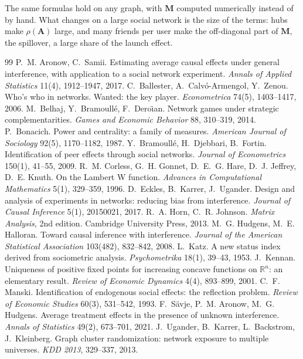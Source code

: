 \documentclass[11pt]{article}
\newcommand{\mA}{\mathbf{A}}
\newcommand{\mM}{\mathbf{M}}
\begin{document}
The same formulas hold on any graph, with $\mM$ computed numerically instead of by hand.  What changes on a large social network is the size of the terms: hubs make $\rho(\mA)$ large, and many friends per user make the off-diagonal part of $\mM$, the spillover, a large share of the launch effect.

{\scriptsize
\begin{thebibliography}{99}\setlength{\itemsep}{0pt}
 P.~M. Aronow, C.~Samii. Estimating average causal effects under general interference, with application to a social network experiment. \emph{Annals of Applied Statistics} 11(4), 1912--1947, 2017.
 C.~Ballester, A.~Calv\'o-Armengol, Y.~Zenou. Who's who in networks. Wanted: the key player. \emph{Econometrica} 74(5), 1403--1417, 2006.
 M.~Belhaj, Y.~Bramoull\'e, F.~Dero\"{\i}an. Network games under strategic complementarities. \emph{Games and Economic Behavior} 88, 310--319, 2014.
 P.~Bonacich. Power and centrality: a family of measures. \emph{American Journal of Sociology} 92(5), 1170--1182, 1987.
 Y.~Bramoull\'e, H.~Djebbari, B.~Fortin. Identification of peer effects through social networks. \emph{Journal of Econometrics} 150(1), 41--55, 2009.
 R.~M. Corless, G.~H. Gonnet, D.~E.~G. Hare, D.~J. Jeffrey, D.~E. Knuth. On the Lambert W function. \emph{Advances in Computational Mathematics} 5(1), 329--359, 1996.
 D.~Eckles, B.~Karrer, J.~Ugander. Design and analysis of experiments in networks: reducing bias from interference. \emph{Journal of Causal Inference} 5(1), 20150021, 2017.
 R.~A. Horn, C.~R. Johnson. \emph{Matrix Analysis}, 2nd edition. Cambridge University Press, 2013.
 M.~G. Hudgens, M.~E. Halloran. Toward causal inference with interference. \emph{Journal of the American Statistical Association} 103(482), 832--842, 2008.
 L.~Katz. A new status index derived from sociometric analysis. \emph{Psychometrika} 18(1), 39--43, 1953.
 J.~Kennan. Uniqueness of positive fixed points for increasing concave functions on $\mathbb{R}^n$: an elementary result. \emph{Review of Economic Dynamics} 4(4), 893--899, 2001.
 C.~F. Manski. Identification of endogenous social effects: the reflection problem. \emph{Review of Economic Studies} 60(3), 531--542, 1993.
 F.~S\"avje, P.~M. Aronow, M.~G. Hudgens. Average treatment effects in the presence of unknown interference. \emph{Annals of Statistics} 49(2), 673--701, 2021.
 J.~Ugander, B.~Karrer, L.~Backstrom, J.~Kleinberg. Graph cluster randomization: network exposure to multiple universes. \emph{KDD 2013}, 329--337, 2013.
\end{thebibliography}}
\end{document}
